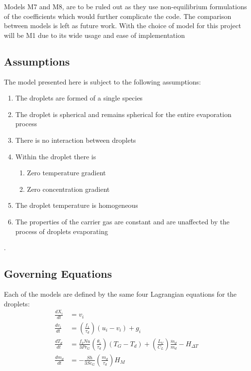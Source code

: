 \documentclass[../Interim_Report_Master]{subfiles}
\begin{document}
Models M7 and M8, are to be ruled out as they use non-equilibrium formulations of the coefficients which would further complicate the code. The comparison between models is left as future work. With the choice of model for this project will be M1 due to its wide usage and ease of implementation

\subsection{Assumptions}
The model presented here is subject to the following assumptions:
\begin{enumerate}
	\item The droplets are formed of a single species
	\item The droplet is spherical and remains spherical for the entire evaporation process
	\item There is no interaction between droplets
	\item Within the droplet there is 
		\begin{enumerate}
			\item Zero temperature gradient
			\item Zero concentration gradient
		\end{enumerate}
	\item The droplet temperature is homogeneous
	\item The properties of the carrier gas are constant and are unaffected by the process of droplets evaporating
\end{enumerate}

\cite{Miller1998}\cite{arnold2000}.

\subsection{Governing Equations}
Each of the models are defined by the same four Lagrangian equations for the droplets:
\begin{align}
\frac{dX_{i}}{dt} &= v_{i} 
\label{vel} \\
\frac{dv_{i}}{dt} &= \left(\frac{f_{1}}{\tau_{d}}\right)(u_{i}-v_{i}) + g_i 
\label{accel} \\
\frac{dT_{d}}{dt} &= \frac{f_{2}Nu}{3Pr_{G}}\left(\frac{\theta_1}{\tau_d}\right)(T_{G}-T_{d}) + \left(\frac{L_{V}}{C_{L}}\right)\frac{\dot{m}_{d}}{m_{d}} - H_{\Delta T} 
\label{temp} \\
\frac{dm_{d}}{dt} &= -\frac{Sh}{3Sc_{G}}\left(\frac{m_{d}}{\tau_{d}}\right)H_M
\label{mass}
\end{align}
\end{document}
